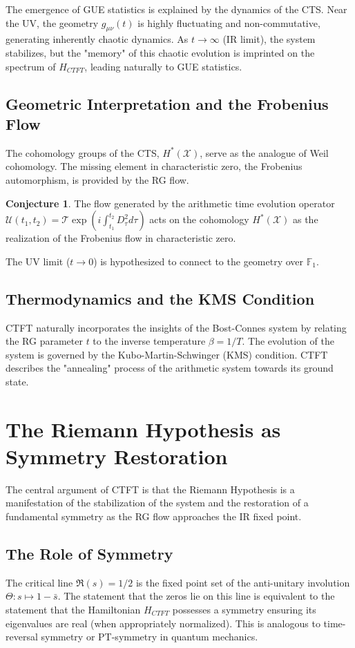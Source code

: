\documentclass[11pt, a4paper]{article}
\theoremstyle{definition}
\newtheorem{conjecture}{Conjecture}[section]
\newcommand{\CTS}{\mathcal{X}}
\newcommand{\F}{\mathbb{F}_1}
\begin{document}
The emergence of GUE statistics is explained by the dynamics of the CTS. Near the UV, the geometry $g_{\mu\nu}(t)$ is highly fluctuating and non-commutative, generating inherently chaotic dynamics. As $t\to\infty$ (IR limit), the system stabilizes, but the "memory" of this chaotic evolution is imprinted on the spectrum of $H_{CTFT}$, leading naturally to GUE statistics.

\subsection{Geometric Interpretation and the Frobenius Flow}
The cohomology groups of the CTS, $H^*(\CTS)$, serve as the analogue of Weil cohomology. The missing element in characteristic zero, the Frobenius automorphism, is provided by the RG flow.

\begin{conjecture}
The flow generated by the arithmetic time evolution operator $\mathcal{U}(t_1, t_2) = \mathcal{T} \exp\left(i \int_{t_1}^{t_2} D_\tau^2 d\tau\right)$ acts on the cohomology $H^*(\CTS)$ as the realization of the Frobenius flow in characteristic zero.
\end{conjecture}

The UV limit ($t\to 0$) is hypothesized to connect to the geometry over $\F$.

\subsection{Thermodynamics and the KMS Condition}
CTFT naturally incorporates the insights of the Bost-Connes system by relating the RG parameter $t$ to the inverse temperature $\beta = 1/T$. The evolution of the system is governed by the Kubo-Martin-Schwinger (KMS) condition. CTFT describes the "annealing" process of the arithmetic system towards its ground state.

\section{The Riemann Hypothesis as Symmetry Restoration}
The central argument of CTFT is that the Riemann Hypothesis is a manifestation of the stabilization of the system and the restoration of a fundamental symmetry as the RG flow approaches the IR fixed point.

\subsection{The Role of Symmetry}
The critical line $\Re(s) = 1/2$ is the fixed point set of the anti-unitary involution $\Theta: s \mapsto 1-\bar{s}$. The statement that the zeros lie on this line is equivalent to the statement that the Hamiltonian $H_{CTFT}$ possesses a symmetry ensuring its eigenvalues are real (when appropriately normalized). This is analogous to time-reversal symmetry or PT-symmetry in quantum mechanics.
\end{document}
